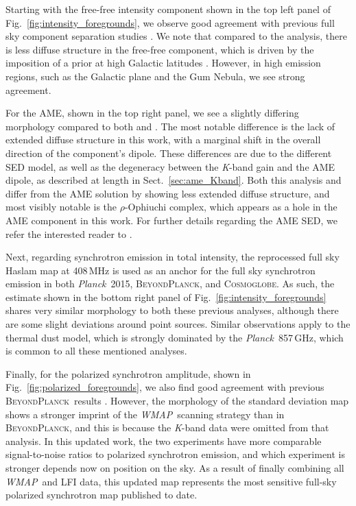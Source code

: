 \documentclass[twocolumn]{../../common/aa}
\def\WMAP{\emph{WMAP}}
\def\Planck{\emph{Planck}}
\newcommand{\bp}{\textsc{BeyondPlanck}}
\newcommand{\cosmoglobe}{\textsc{Cosmoglobe}}
\newcommand{\K}[0]{\textit K}
\begin{document}


Starting with the free-free intensity component shown in the top left panel of Fig.~\ref{fig:intensity_foregrounds}, we observe good agreement with previous full sky component separation studies \citep{planck2014-a12,bp13}. We note that compared to the \cite{planck2014-a12} analysis, there is less diffuse structure in the free-free component, which is driven by the imposition of a prior at high Galactic latitudes \citep{bp13}. However, in high emission regions, such as the Galactic plane and the Gum Nebula, we see strong agreement.

For the AME, shown in the top right panel, we see a slightly differing morphology compared to both \cite{planck2014-a12} and \cite{bp13}. The most notable difference is the lack of extended diffuse structure in this work, with a marginal shift in the overall direction of the component's dipole. These differences are due to the different SED model, as well as the degeneracy between the \K-band gain and the AME dipole, as described at length in Sect.~\ref{sec:ame_Kband}. Both this analysis and \cite{bp13} differ from the \cite{planck2014-a12} AME solution by showing less extended diffuse structure, and most visibly notable is the $\rho$-Ophiuchi complex, which appears as a hole in the AME component in this work. For further details regarding the AME SED, we refer the interested reader to \citet{watts2023_ame}.

Next, regarding synchrotron emission in total intensity, the reprocessed full sky Haslam map \citep{remazeilles2014} at 408\,MHz is used as an anchor for the full sky synchrotron emission in both \Planck\ 2015, \bp, and \cosmoglobe. As such, the estimate shown in the bottom right panel of Fig.~\ref{fig:intensity_foregrounds} shares very similar morphology to both these previous analyses, although there are some slight deviations around point sources. Similar observations apply to the thermal dust model, which is strongly dominated by the \Planck\ 857\,GHz, which is common to all these mentioned analyses. 

Finally, for the polarized synchrotron amplitude, shown in Fig.~\ref{fig:polarized_foregrounds}, we also find good agreement with previous \bp\ results \citep{bp14}. However, the morphology of the standard deviation map shows a stronger imprint of the \WMAP\ scanning strategy than in \bp, and this is because the \K-band data were omitted from that analysis. In this updated work, the two experiments have more comparable signal-to-noise ratios to polarized synchrotron emission, and which experiment is stronger depends now on position on the sky. As a result of finally combining all \WMAP\ and LFI data, this updated map represents the most sensitive full-sky polarized synchrotron map published to date.
\end{document}
